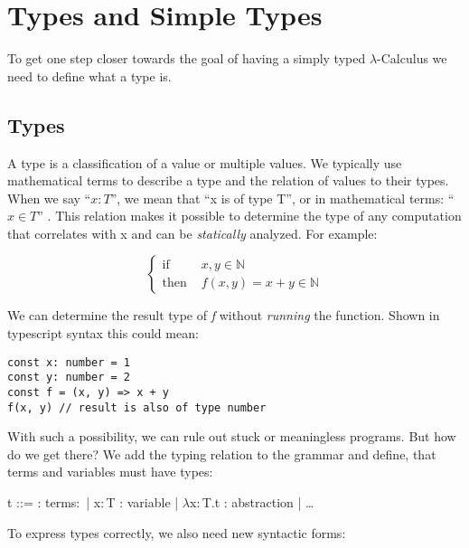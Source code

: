 \section{Types and Simple Types}

To get one step closer towards the goal of having a
simply typed $\lambda$-Calculus we need to define
what a type is.

\subsection{Types}

A type is a classification of a value or multiple values.
We typically use mathematical terms to describe a type and the relation
of values to their types. When we say ``$x : T$'', we mean that
``x is of type T'', or in mathematical terms: ``$x \in T$'' \cite{pierce2002ProgLang}.
This relation makes it possible to determine the type of any computation
that correlates with x and can be \textit{statically} analyzed.
For example:

\begin{equation*}
    \begin{cases}
        \text{if }   & x,y \in \mathbb{N}            \\
        \text{then } & f(x,y) = x + y \in \mathbb{N}
    \end{cases}
\end{equation*}

We can determine the result type of \textit{f} without
\textit{running} the function. Shown in typescript syntax this could mean:

\begin{lstlisting}[style=JavaScript, caption={TypeScript type inference}, captionpos=b]
const x: number = 1
const y: number = 2
const f = (x, y) => x + y
f(x, y) // result is also of type number
\end{lstlisting}

With such a possibility, we can rule out stuck or meaningless programs.
But how do we get there? We add the typing relation to
the grammar and define, that terms and variables must have types:

\begin{bnfgrammar}
    t ::= : terms$\colon$
    | x$\colon$T : variable
    | $\lambda$x$\colon$T.t : abstraction
    | \dots
\end{bnfgrammar}

To express types correctly, we also need new syntactic forms:


